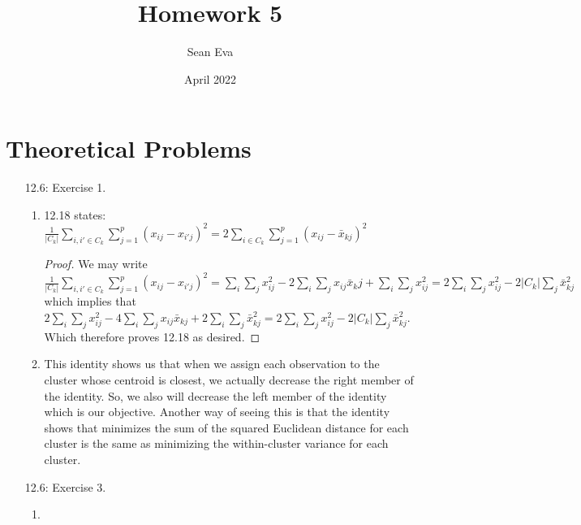 \documentclass{article}
\title{Homework 5}
\author{Sean Eva}
\date{April 2022}
\begin{document}
\maketitle

\section{Theoretical Problems}
\begin{enumerate}
    \item [12.6: Exercise 1. ]
    
    \begin{enumerate}
        \item 
        
        12.18 states: $\frac{1}{|C_k|}\sum_{i, i'\in C_k}\sum_{j=1}^p(x_{ij}-x_{i'j})^2 = 2\sum_{i\in C_k}\sum_{j=1}^p(x_{ij}-\bar{x}_{kj})^2$
        \begin{proof}
        We may write $\frac{1}{|C_k|}\sum_{i, i'\in C_k}\sum_{j=1}^p(x_{ij}-x_{i'j})^2 = \sum_i\sum_jx^2_{ij}-2\sum_i\sum_jx_{ij}\bar{x}_kj + \sum_i\sum_jx^2_{ij} = 2\sum_i\sum_jx^2_{ij}-2|C_k|\sum_j\bar{x}^2_{kj}$ which implies that $2\sum_i\sum_jx^2_{ij}-4\sum_i\sum_jx_{ij}\bar{x}_{kj} + 2\sum_i\sum_j\bar{x}^2_{kj} = 2\sum_i\sum_jx^2_{ij}-2|C_k|\sum_j\bar{x}^2_{kj}.$ Which therefore proves 12.18 as desired.
        \end{proof}
        
        \item
        
        This identity shows us that when we assign each observation to the cluster whose centroid is closest, we actually decrease the right member of the identity. So, we also will decrease the left member of the identity which is our objective. Another way of seeing this is that the identity shows that minimizes the sum of the squared Euclidean distance for each cluster is the same as minimizing the within-cluster variance for each cluster.
        
    \end{enumerate}
    
    \item [12.6: Exercise 3. ]
    
    \begin{enumerate}
        \item 
        

\end{enumerate}
\end{enumerate}
\end{document}
